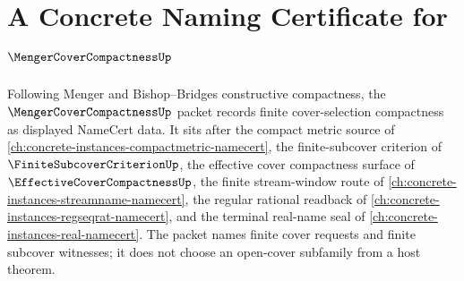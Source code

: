 \chapter{A Concrete Naming Certificate for $\MengerCoverCompactnessUp$}
\label{ch:concrete-instances-menger-cover-compactness-namecert}

Following Menger and Bishop--Bridges constructive compactness, the $\MengerCoverCompactnessUp$ packet records finite cover-selection compactness as displayed NameCert data. It sits after the compact metric source of \autoref{ch:concrete-instances-compactmetric-namecert}, the finite-subcover criterion of $\FiniteSubcoverCriterionUp$, the effective cover compactness surface of $\EffectiveCoverCompactnessUp$, the finite stream-window route of \autoref{ch:concrete-instances-streamname-namecert}, the regular rational readback of \autoref{ch:concrete-instances-regseqrat-namecert}, and the terminal real-name seal of \autoref{ch:concrete-instances-real-namecert}. The packet names finite cover requests and finite subcover witnesses; it does not choose an open-cover subfamily from a host theorem.

